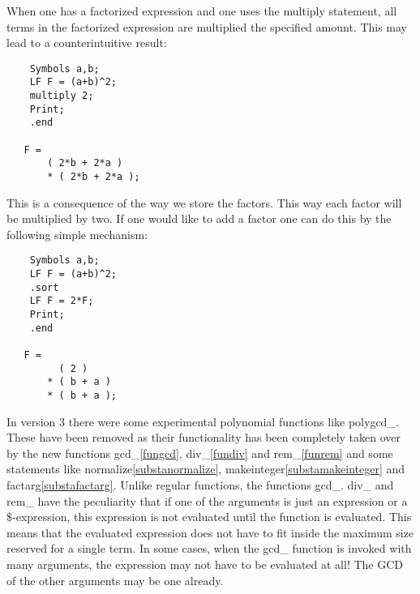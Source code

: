 \noindent When one has a factorized expression and one uses the multiply 
statement, all terms in the factorized expression are multiplied the 
specified amount. This may lead to a counterintuitive result:
\begin{verbatim}
    Symbols a,b;
    LF F = (a+b)^2;
    multiply 2;
    Print;
    .end

   F =
       ( 2*b + 2*a )
       * ( 2*b + 2*a );
\end{verbatim}
This is a consequence of the way we store the factors. This way each factor 
will be multiplied by two. If one would like to add a factor one can do 
this by the following simple mechanism:
\begin{verbatim}
    Symbols a,b;
    LF F = (a+b)^2;
    .sort
    LF F = 2*F;
    Print;
    .end

   F =
         ( 2 )
       * ( b + a )
       * ( b + a );
\end{verbatim}

\noindent In version 3 there were some experimental polynomial functions 
like polygcd\_. These have been 
removed as their functionality has been completely taken over by the new 
functions gcd\_\ref{fungcd}, div\_\ref{fundiv} and rem\_\ref{funrem} and 
some statements like normalize\ref{substanormalize}, 
makeinteger\ref{substamakeinteger} and factarg\ref{substafactarg}. Unlike 
regular functions, the functions gcd\_. div\_ and rem\_ have the 
peculiarity that if one of the arguments is just an expression or a 
\$-expression, this expression is not evaluated until the function is 
evaluated. This means that the evaluated expression does not have to fit 
inside the maximum size reserved for a single term. In some cases, when the 
gcd\_ function is invoked with many arguments, the expression may not have 
to be evaluated at all! The GCD of the other arguments may be one already.


